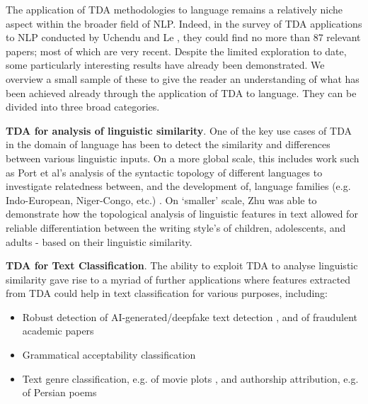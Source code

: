 \documentclass[12pt,twoside]{report}
\begin{document}
The application of TDA methodologies to language remains a relatively niche aspect within the broader field of NLP. Indeed, in the survey of TDA applications to NLP conducted by Uchendu and Le \cite{uchendu2024unveilingtopologicalstructurestext}, they could find no more than 87 relevant papers; most of which are very recent. Despite the limited exploration to date, some particularly interesting results have already been demonstrated. We overview a small sample of these to give the reader an understanding of what has been achieved already through the application of TDA to language. They can be divided into three broad categories. \newline \par

\textbf{TDA for analysis of linguistic similarity}. One of the key use cases of TDA in the domain of language has been to detect the similarity and differences between various linguistic inputs. On a more global scale, this includes work such as Port et al's analysis of the syntactic topology of different languages to investigate relatedness between, and the development of, language families (e.g. Indo-European, Niger-Congo, etc.) \cite{port2018, port2022}. On `smaller' scale, Zhu \cite{zhu2013} was able to demonstrate how the topological analysis of linguistic features in text allowed for reliable differentiation between the writing style's of children, adolescents, and adults - based on their linguistic similarity. \newline \par

\textbf{TDA for Text Classification}. The ability to exploit TDA to analyse linguistic similarity gave rise to a myriad of further applications where features extracted from TDA could help in text classification for various purposes, including:
\begin{itemize}[itemsep=0pt]
    \item Robust detection of AI-generated/deepfake text detection \cite{uchendu2024topformertopologyawareauthorshipattribution, tulchinskii2023intrinsicdimensionestimationrobust, kushnareva2024aigeneratedtextboundarydetection}, and of fraudulent academic papers \cite{tymochko2021}
    \item Grammatical acceptability classification \cite{cherniavskii-etal-2022-acceptability}
    \item Text genre classification, e.g. of movie plots \cite{doshi2018}, and authorship attribution, e.g. of Persian poems \cite{elyasi2019introductionnewtextclassification}
\end{itemize}
\end{document}
